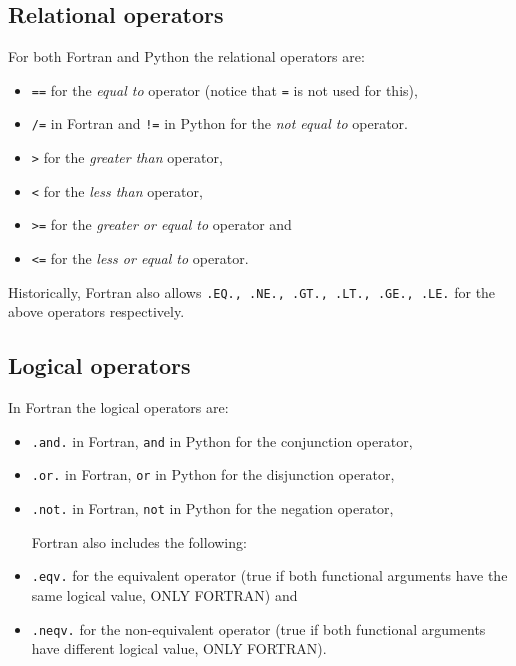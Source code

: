         
        
        
        \subsection*{Relational operators}
        \vspace{-0.5cm}
        For both Fortran and Python the relational operators are:
        \vspace{-0.7cm}
        \begin{itemize}[noitemsep]
            \item \texttt{==} for the \textit{equal to} operator (notice that \texttt{=} is not used for this), 
            \item \texttt{/=} in Fortran and \texttt{!=} in Python for the \textit{not equal to} operator.
            \item \texttt{>} for the \textit{greater than} operator,
            \item \texttt{<} for the \textit{less than} operator,
            \item \texttt{>=} for the \textit{greater or equal to} operator and
            \item \texttt{<=} for the \textit{less or equal to} operator.
        \end{itemize}
        Historically, Fortran also allows \texttt{.EQ., .NE., .GT., .LT., .GE., .LE.} for the above operators respectively. 
    
        
        \subsection*{Logical operators}
        \vspace{-0.5cm}
        In Fortran the logical operators are:
        \vspace{-0.7cm}
        \begin{itemize}[noitemsep]
            \item \texttt{.and.} in Fortran, \texttt{and} in Python for the conjunction operator, 
            \item \texttt{.or.} in Fortran, \texttt{or} in Python for the disjunction operator,
            \item \texttt{.not.} in Fortran, \texttt{not} in Python for the negation operator,
            
            \vspace{0.3cm}
            Fortran also includes the following:
            \item \texttt{.eqv.} for the equivalent operator (true if both functional arguments have the same logical value, ONLY FORTRAN) and
            \item \texttt{.neqv.} for the non-equivalent operator (true if both functional arguments have different logical value, ONLY FORTRAN).
        \end{itemize}
    
